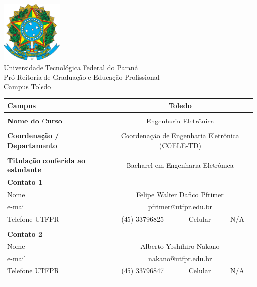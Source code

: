 \begin{center}
    \includegraphics[width=3cm]{brasao.eps} \\
    \Large Universidade Tecnológica Federal do Paraná \\
    Pró-Reitoria de Graduação e Educação Profissional \\
    Campus Toledo
\end{center}

\begin{table}[hbt]
    \centering
    \begin{tabularx}{\textwidth}{|>{\raggedright}X|c|c|c| }
        \hline
        \textbf{Campus}  &   \multicolumn{3}{c|}{Toledo} \\    \hline
        \multicolumn{4}{|c|}{} \\   \hline
        \textbf{Nome do Curso}  &   \multicolumn{3}{c|}{Engenharia Eletrônica} \\    \hline
        \multicolumn{4}{|c|}{} \\   \hline
        \textbf{Coordenação / Departamento}  &   \multicolumn{3}{c|}{Coordenação de Engenharia Eletrônica (COELE-TD) } \\   \hline
        \multicolumn{4}{|c|}{} \\   \hline
        \textbf{Titulação conferida ao estudante}  &   \multicolumn{3}{c|}{Bacharel em Engenharia Eletrônica} \\   \hline
        \textbf{Contato 1}  &   \multicolumn{3}{c|}{} \\    \hline
        Nome  &   \multicolumn{3}{c|}{Felipe Walter Dafico Pfrimer} \\    \hline
        e-mail  &   \multicolumn{3}{c|}{pfrimer@utfpr.edu.br} \\    \hline
        Telefone UTFPR  &   (45) 33796825 & Celular & N/A \\    \hline
        \multicolumn{4}{|c|}{} \\   \hline
        \textbf{Contato 2}  &   \multicolumn{3}{c|}{} \\    \hline
        Nome  &   \multicolumn{3}{c|}{Alberto Yoshihiro Nakano} \\    \hline
        e-mail  &   \multicolumn{3}{c|}{nakano@utfpr.edu.br} \\    \hline
        Telefone UTFPR  &   (45) 33796847 & Celular & N/A \\    \hline
        \multicolumn{4}{|c|}{} \\   \hline
        \multicolumn{4}{|c|}{\textbf{Data}: \today} \\   \hline
    \end{tabularx}
\end{table}

\newpage